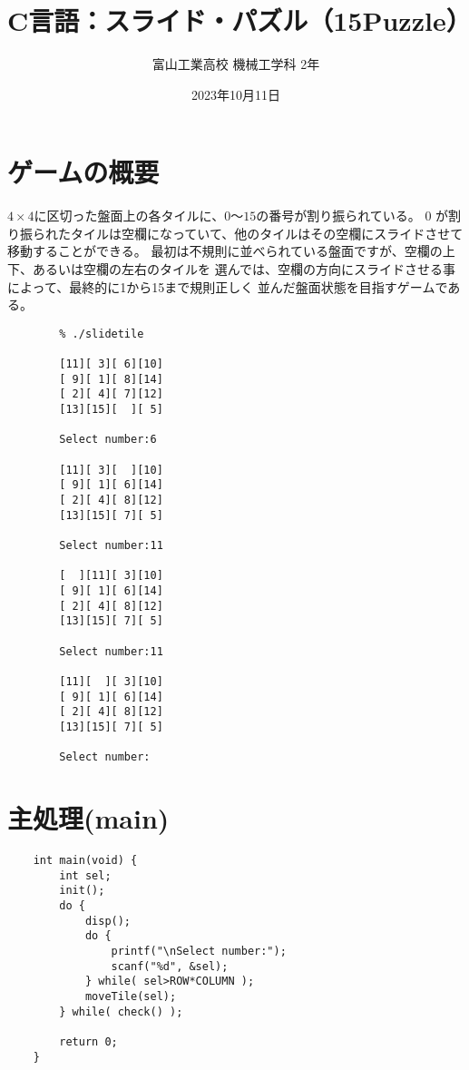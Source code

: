 \documentclass[uplatex,a4paper,11pt,oneside,openany]{jsarticle}
\begin{document}
	\title{C言語：スライド・パズル（15Puzzle）}
	\author{富山工業高校 機械工学科 2年}
	\date{2023年10月11日}
	\maketitle
	\pagestyle{empty}

\newpage

\section{ゲームの概要}

$4 \times 4$に区切った盤面上の各タイルに、$0〜15$の番号が割り振られている。
0 が割り振られたタイルは空欄になっていて、他のタイルはその空欄にスライドさせて
移動することができる。
最初は不規則に並べられている盤面ですが、空欄の上下、あるいは空欄の左右のタイルを
選んでは、空欄の方向にスライドさせる事によって、最終的に1から15まで規則正しく
並んだ盤面状態を目指すゲームである。

\begin{spacing}{0.74}
	\begin{verbatim}
		% ./slidetile
		
		[11][ 3][ 6][10]
		[ 9][ 1][ 8][14]
		[ 2][ 4][ 7][12]
		[13][15][  ][ 5]
		
		Select number:6
		
		[11][ 3][  ][10]
		[ 9][ 1][ 6][14]
		[ 2][ 4][ 8][12]
		[13][15][ 7][ 5]
		
		Select number:11
		
		[  ][11][ 3][10]
		[ 9][ 1][ 6][14]
		[ 2][ 4][ 8][12]
		[13][15][ 7][ 5]
		
		Select number:11
		
		[11][  ][ 3][10]
		[ 9][ 1][ 6][14]
		[ 2][ 4][ 8][12]
		[13][15][ 7][ 5]
		
		Select number:
	\end{verbatim}
\end{spacing}

\newpage

\section{主処理(main)}

\begin{lstlisting}
	int main(void) {
		int sel;
		init();
		do {
			disp();
			do {
				printf("\nSelect number:");
				scanf("%d", &sel);
			} while( sel>ROW*COLUMN );
			moveTile(sel);
		} while( check() );
		
		return 0;
	}
\end{lstlisting}
\end{document}
